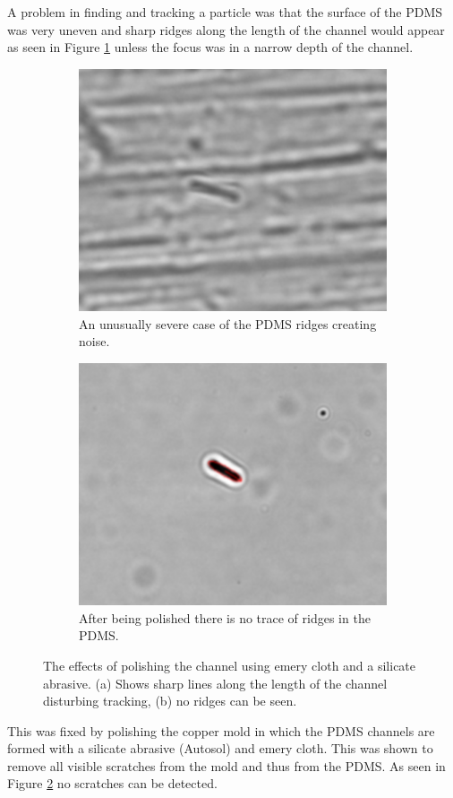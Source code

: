 A problem in finding and tracking a particle was that the surface of the PDMS was very uneven and sharp ridges along the length of the channel would appear as seen in Figure \ref{fig:unpolished} unless the focus was in a narrow depth of the channel. 
 
 \begin{figure}[H]
 \centering
 \begin{subfigure}[3a]{0.40\textwidth}
 \includegraphics[width=\textwidth]{figures/improvements/unpolished.png}
 \caption{An unusually severe case of the PDMS ridges creating noise.}\label{fig:unpolished}
 \end{subfigure}\hspace{1em}%
 \begin{subfigure}[3b]{0.40\textwidth}
 \includegraphics[width=\textwidth]{figures/improvements/polished.png}
 \caption{After being polished there is no trace of ridges in the PDMS.}\label{fig:polished}
 \end{subfigure}
 \caption{The effects of polishing the channel using emery cloth and a silicate abrasive. (a) Shows sharp lines along the length of the channel disturbing tracking, (b) no ridges can be seen.}
 \label{fig:polisheffect}
 \end{figure}
 

This was fixed by polishing the copper mold in which the PDMS channels are formed with a silicate abrasive (Autosol) and emery cloth. This was shown to remove all visible scratches from the mold and thus from the PDMS. As seen in Figure \ref{fig:polished} no scratches can be detected.